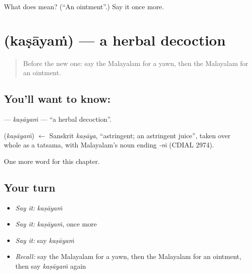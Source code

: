 \begin{tcolorbox}[breakable,colback=teal!4,colframe=teal!35!black,title={Before you move on}]
What does  mean? (\textquotedblleft{}An ointment\textquotedblright{}.) Say it once more.
\end{tcolorbox}
\section[\texorpdfstring{\ml{കഷായം} (kaṣāyaṁ)}{കഷായം (kaṣāyaṁ)}]{ (kaṣāyaṁ) — a herbal decoction}

\label{lesson:ML-C313-kasayam}



\begin{quote}
Before the new one: say the Malayalam for a yawn, then the Malayalam for an ointment.
\end{quote}

\subsection*{You'll want to know: }
\textbf{} — \emph{kaṣāyaṁ} — \textquotedblleft{}a herbal decoction\textquotedblright{}.

\begin{cousinweb}
\textbf{} (\emph{kaṣāyaṁ}) $\leftarrow$ Sanskrit \emph{kaṣāya}, \textquotedblleft{}astringent; an astringent juice\textquotedblright{}, taken over whole as a tatsama, with Malayalam's noun ending \emph{-ṁ} (CDIAL 2974).
\end{cousinweb}

\begin{grammarlens}[title={What you've built}]
One more word for this chapter.
\end{grammarlens}

\subsection*{Your turn}
\begin{itemize}
\raggedright
  \item \emph{Say it:} \emph{kaṣāyaṁ}
  \item \emph{Say it:} \emph{kaṣāyaṁ}, once more
  \item \emph{Say it:} say \emph{kaṣāyaṁ}
  \item \emph{Recall:} say the Malayalam for a yawn, then the Malayalam for an ointment, then say \emph{kaṣāyaṁ} again
\end{itemize}

